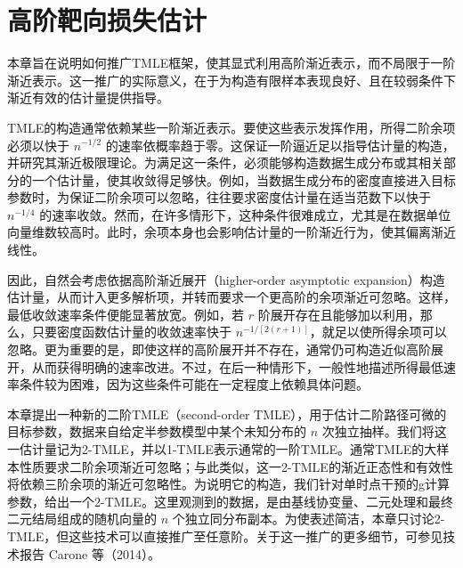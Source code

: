 \chapter{高阶靶向损失估计}
\label{ch:higher-order-targeted-loss}

\begin{sourcebox}
本章旨在说明如何推广TMLE框架，使其显式利用高阶渐近表示，而不局限于一阶渐近表示。这一推广的实际意义，在于为构造有限样本表现良好、且在较弱条件下渐近有效的估计量提供指导。
\end{sourcebox}

TMLE的构造通常依赖某些一阶渐近表示。要使这些表示发挥作用，所得二阶余项必须以快于 $n^{-1/2}$ 的速率依概率趋于零。这保证一阶逼近足以指导估计量的构造，并研究其渐近极限理论。为满足这一条件，必须能够构造数据生成分布或其相关部分的一个估计量，使其收敛得足够快。例如，当数据生成分布的密度直接进入目标参数时，为保证二阶余项可以忽略，往往要求密度估计量在适当范数下以快于 $n^{-1/4}$ 的速率收敛。然而，在许多情形下，这种条件很难成立，尤其是在数据单位向量维数较高时。此时，余项本身也会影响估计量的一阶渐近行为，使其偏离渐近线性。

因此，自然会考虑依据高阶渐近展开（higher-order asymptotic expansion）构造估计量，从而计入更多解析项，并转而要求一个更高阶的余项渐近可忽略。这样，最低收敛速率条件便能显著放宽。例如，若 $r$ 阶展开存在且能够加以利用，那么，只要密度函数估计量的收敛速率快于 $n^{-1/[2(r+1)]}$，就足以使所得余项可以忽略。更为重要的是，即使这样的高阶展开并不存在，通常仍可构造近似高阶展开，从而获得明确的速率改进。不过，在后一种情形下，一般性地描述所得最低速率条件较为困难，因为这些条件可能在一定程度上依赖具体问题。

本章提出一种新的二阶TMLE（second-order TMLE），用于估计二阶路径可微的目标参数，数据来自给定半参数模型中某个未知分布的 $n$ 次独立抽样。我们将这一估计量记为2-TMLE，并以1-TMLE表示通常的一阶TMLE。通常TMLE的大样本性质要求二阶余项渐近可忽略；与此类似，这一2-TMLE的渐近正态性和有效性将依赖三阶余项的渐近可忽略性。为说明它的构造，我们针对单时点干预的g计算参数，给出一个2-TMLE。这里观测到的数据，是由基线协变量、二元处理和最终二元结局组成的随机向量的 $n$ 个独立同分布副本。为使表述简洁，本章只讨论2-TMLE，但这些技术可以直接推广至任意阶。关于这一推广的更多细节，可参见技术报告 Carone 等（2014）。

